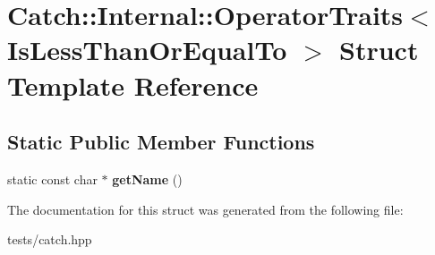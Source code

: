 \hypertarget{struct_catch_1_1_internal_1_1_operator_traits_3_01_is_less_than_or_equal_to_01_4}{}\section{Catch\+:\+:Internal\+:\+:Operator\+Traits$<$ Is\+Less\+Than\+Or\+Equal\+To $>$ Struct Template Reference}
\label{struct_catch_1_1_internal_1_1_operator_traits_3_01_is_less_than_or_equal_to_01_4}
\subsection*{Static Public Member Functions}
\begin{DoxyCompactItemize}
\item 
\mbox{\label{struct_catch_1_1_internal_1_1_operator_traits_3_01_is_less_than_or_equal_to_01_4_ae8578813bc847838f10448c1541a9d7b}} 
static const char $\ast$ {\bfseries get\+Name} ()
\end{DoxyCompactItemize}


The documentation for this struct was generated from the following file\+:\begin{DoxyCompactItemize}
\item 
tests/catch.\+hpp\end{DoxyCompactItemize}
